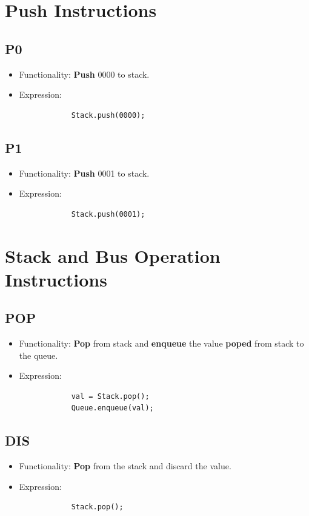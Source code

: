 \documentclass[11pt]{report}
\begin{document}
    \section{Push Instructions}
    \subsection{P0}
    \begin{itemize}
        \item Functionality: \textbf{Push} 0000 to stack.
        \item Expression:
        \begin{verbatim}
            Stack.push(0000);
        \end{verbatim}
    \end{itemize}

    \subsection{P1}
    \begin{itemize}
        \item Functionality: \textbf{Push} 0001 to stack.
        \item Expression:
        \begin{verbatim}
            Stack.push(0001);
        \end{verbatim}
    \end{itemize}

    \section{Stack and Bus Operation Instructions}
    \subsection{POP}
    \begin{itemize}
        \item Functionality: \textbf{Pop} from stack and
                \textbf{enqueue} the value \textbf{poped} from stack to the queue.
        \item Expression:
        \begin{verbatim}
            val = Stack.pop();
            Queue.enqueue(val);
        \end{verbatim}
    \end{itemize}

    \subsection{DIS}
    \begin{itemize}
        \item Functionality: \textbf{Pop} from the stack and discard the value.
        \item Expression:
        \begin{verbatim}
            Stack.pop();
        \end{verbatim}
    \end{itemize}
\end{document}
